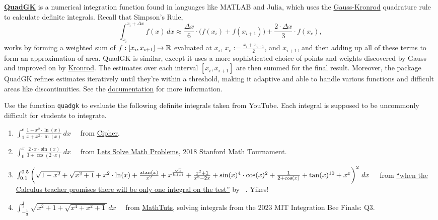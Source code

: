 \href{https://juliamath.github.io/QuadGK.jl/stable/}{\bf QuadGK} is a numerical integration function found in languages like MATLAB and Julia, which uses the \href{https://en.wikipedia.org/wiki/Gauss%E2%80%93Kronrod_quadrature_formula}{Gauss-Kronrod} quadrature rule to calculate definite integrals. Recall that Simpson's Rule,
$$ \int_{x_i}^{x_i + \Delta x} f(x)\, dx  \approx \frac{ \Delta x}{6} \cdot \big(  f(x_i) +  f(x_{i+1}) \big) +   \frac{2 \cdot \Delta x}{3} \cdot f(x_c), $$
 works by forming a weighted sum of $f:[x_i, x_{i+1}] \to \mathbb R$ evaluated at $x_i$, $x_c:=\frac{x_i + x_{i+1}}{2}$, and $x_{i+1}$, and then adding up all of these terms to form an approximation of area. QuadGK is similar, except it uses a more sophisticated choice of points and weights discovered by Gauss and improved on by \href{https://en.wikipedia.org/wiki/Gauss%E2%80%93Kronrod_quadrature_formula}{Kronrod}. The estimates over each interval $[x_i, x_{i+1}]$ are then summed for the final result. Moreover, the package QuadGK refines estimates iteratively until they're within a threshold, making it adaptive and able to handle various functions and difficult areas like discontinuities. See the \href{https://juliamath.github.io/QuadGK.jl/stable/}{documentation} for more information. \\

\begin{example} Use the function \texttt{quadgk} to evaluate the following definite integrals taken from YouTube. Each integral is supposed to be uncommonly difficult for students to integrate.

\begin{enumerate}
\renewcommand{\labelenumi}{(\alph{enumi})}
\setlength{\itemsep}{.2cm}
    \item $\int_{1}^{e} \frac{1 + x^2 \cdot \ln(x)}{x + x^2 \cdot \ln(x)}\, dx$ ~~from \href{https://youtu.be/VwjSWqXelvI}{Cipher}.

    \item $ \int_0^{\pi} \frac{2\cdot x \cdot \sin(x)}{3 + \cos(2 \cdot x)}\, dx$ ~~from \href{https://www.youtube.com/watch?v=4fYbyU85PSM}{Lets Solve Math Problems}, 2018 Stanford Math Tournament.

    \item  $ \int_{0.1}^{0.5} \left(\sqrt{1 - x^2} + \sqrt{x^2+1}+ x^2 \cdot \ln(x) + \frac{\mathrm{atan}(x)}{x^2} + 
    x^\frac{ \sqrt{x}}{\ln(x)} + \frac{x^2+1}{x^3-2x} + \sin(x)^4 \cdot  \cos(x)^2 +
      \frac{1}{ 2 + \cos(x) } + \tan(x)^{10} + x^x \right)^2\, dx$ ~~from \href{https://www.youtube.com/shorts/F3T-crJ0l5o?feature=share}{``when the Calculus teacher promises there will be only one integral on the test''} by ~\bprp. Yikes! 

      \item $\int_{-\frac{1}{2}}^{\frac{1}{2}} \sqrt{x^2 + 1 + \sqrt{x^4 + x^2 + 1}}\, dx$ ~~from \href{https://www.youtube.com/watch?v=y4ncM9YmY7Y}{MathTuts}, solving integrals from the 2023 MIT Integration Bee Finals: Q3.
\end{enumerate}
    
\end{example}

